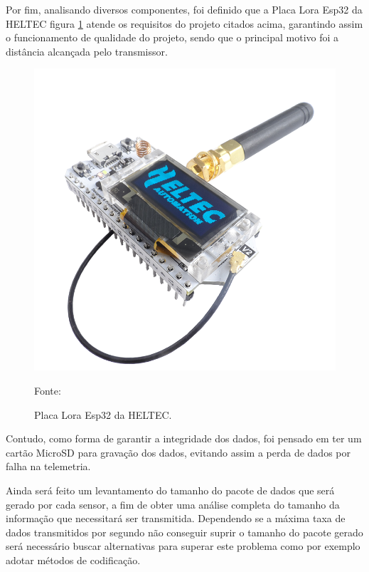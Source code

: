 \par Por fim, analisando diversos componentes, foi definido que a Placa Lora Esp32 da HELTEC figura \ref{fig:Placa Esp32 Lora } atende os requisitos do projeto citados acima, garantindo assim o funcionamento de qualidade do projeto, sendo que o principal motivo foi a distância alcançada pelo transmissor.

\begin{figure}[!htb]
\centering
\includegraphics[scale=0.3]{figuras/SAM_0748_800X800.png}  
\caption{Placa Lora Esp32 da HELTEC.}
{\footnotesize Fonte:\cite{datasheet_ESP32}}
\label{fig:Placa Esp32 Lora }
\end{figure}
\par Contudo, como forma de garantir a integridade dos dados, foi pensado em ter um cartão MicroSD para gravação dos dados, evitando assim a perda de dados por falha na telemetria. 
\par Ainda será feito um levantamento do tamanho do pacote de dados que será gerado por cada sensor, a fim de obter uma análise completa do tamanho da informação que necessitará ser transmitida. Dependendo se a máxima taxa de dados transmitidos por segundo não conseguir suprir o tamanho do pacote gerado será necessário buscar alternativas para superar este problema como por exemplo adotar métodos de codificação\cite{Telemetria_AERONALTICA}. 

